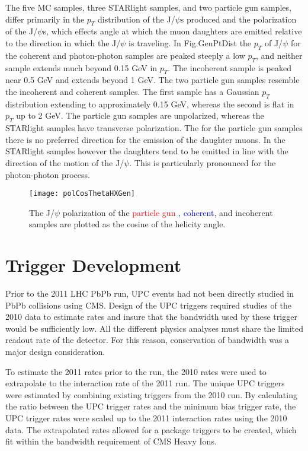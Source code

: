     The five MC samples, three STARlight samples, and two particle gun samples,
      differ primarily in the $p_{T}$ distribution of the J/$\psi$s produced
      and the polarization of the J/$\psi$s, which effects angle at which
      the muon daughters are emitted relative to the direction in which the
      J/$\psi$ is traveling. 
    In Fig.GenPtDist the $p_{T}$ of J/$\psi$ for the coherent and photon-photon
      samples are peaked steeply a low $p_{T}$, and neither sample extends much
      beyond 0.15 GeV in $p_{T}$.
    The incoherent sample is peaked near 0.5 GeV and extends beyond 1 GeV.
    The two particle gun samples resemble the incoherent and coherent samples.
    The first sample has a Gaussian $p_{T}$ distribution extending to 
      approximately 0.15 GeV, whereas the second is flat in $p_{T}$ up to
      2 GeV.
    The particle gun samples are unpolarized, whereas the STARlight samples 
      have transverse polarization. 
    The for the particle gun samples there is no preferred direction for the 
      emission of the daughter muons.
    In the STARlight samples however the daughters tend to be emitted in line
      with the direction of the motion of the J/$\psi$.
    This is particularly pronounced for the photon-photon process. 
    
    \begin{figure}[!Hhbt]
      \centering
      \texttt{[image: polCosThetaHXGen]}
      \caption{ The J/$\psi$ polarization of the \textcolor{red}{particle gun}
        , \textcolor{blue}{coherent}, and incoherent samples are plotted as the
        cosine of the helicity angle.} 
      \label{fig:genHXAngle}
    \end{figure}
  \section{\label{sec:TrigDev} Trigger Development} 
    Prior to the 2011 LHC PbPb run, UPC events had not been directly studied in 
      PbPb collisions using CMS. 
    Design of the UPC triggers required studies of the 2010 data to estimate 
      rates and insure that the bandwidth used by these trigger would be
      sufficiently low. 
    All the different physics analyses must share the limited readout rate of 
      the detector.
    For this reason, conservation of bandwidth was a major design consideration.

    To estimate the 2011 rates prior to the run, the 2010 rates were used to 
      extrapolate to the interaction rate of the 2011 run. 
    The unique UPC triggers were estimated by combining existing triggers from
      the 2010 run. 
    By calculating the ratio between the UPC trigger rates and the minimum bias
      trigger rate, the UPC trigger rates were scaled up to the 2011 
      interaction rates using the 2010 data. 
    The extrapolated rates allowed for a package triggers to be created, which 
      fit within the bandwidth requirement of CMS Heavy Ions. 
    
